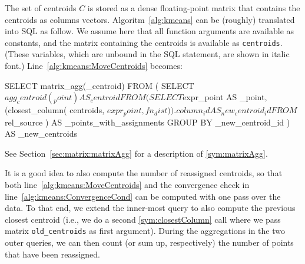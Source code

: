 The set of centroids $C$ is stored as a dense floating-point matrix that contains the centroids as columns vectors. Algoritm~\ref{alg:kmeans} can be (roughly) translated into SQL as follow. We assume here that all function arguments are available as constants, and the matrix containing the centroids is available as \texttt{centroids}. (These variables, which are unbound in the SQL statement, are shown in italic font.) Line~\ref{alg:kmeans:MoveCentroids} becomes:
%
\begin{sql}[emph={centroids,fn_dist}]
    SELECT matrix_agg(_centroid)
    FROM (
        SELECT $agg_centroid(_point) AS _centroid
        FROM (
            SELECT
                $expr_point AS _point,
                (closest_column(
                    centroids,
                    $expr_point,
                    fn_dist
                )).column_id AS _new_centroid_id
            FROM $rel_source
        ) AS _points_with_assignments
        GROUP BY _new_centroid_id
    ) AS _new_centroids
\end{sql}
See Section~\ref{sec:matrix:matrixAgg} for a description of \ref{sym:matrixAgg}.

It is a good idea to also compute the number of reassigned centroids, so that both line~\ref{alg:kmeans:MoveCentroids} and the convergence check in line~\ref{alg:kmeans:ConvergenceCond} can be computed with one pass over the data. To that end, we extend the inner-most query to also compute the previous closest centroid (i.e., we do a second \ref{sym:closestColumn} call where we pass matrix \texttt{old\_centroids} as first argument). During the aggregations in the two outer queries, we can then count (or sum up, respectively) the number of points that have been reassigned.

